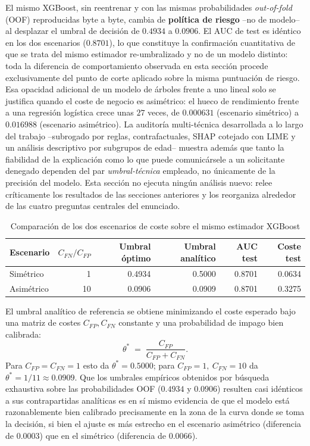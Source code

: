 \documentclass[11pt,a4paper]{article}
\begin{document}
El mismo XGBoost, sin reentrenar y con las mismas probabilidades \emph{out-of-fold} (OOF) reproducidas
byte a byte, cambia de \textbf{pol\'itica de riesgo} --no de modelo-- al desplazar el umbral de decisi\'on
de $0.4934$ a $0.0906$. El AUC de test es id\'entico en los dos escenarios ($0.8701$), lo que constituye
la confirmaci\'on cuantitativa de que se trata del mismo estimador re-umbralizado y no de un modelo
distinto: toda la diferencia de comportamiento observada en esta secci\'on procede exclusivamente del
punto de corte aplicado sobre la misma puntuaci\'on de riesgo. Esa opacidad adicional de un modelo de
\'arboles frente a uno lineal solo se justifica quando el coste de negocio es asim\'etrico: el hueco de
rendimiento frente a una regresi\'on log\'istica crece unas $27$ veces, de $0.000631$ (escenario sim\'etrico)
a $0.016988$ (escenario asim\'etrico). La auditor\'ia multi-t\'ecnica desarrollada a lo largo del trabajo
--subrogado por reglas, contrafactuales, SHAP cotejado con LIME y un an\'alisis descriptivo por subgrupos
de edad-- muestra adem\'as que tanto la fiabilidad de la explicaci\'on como lo que puede comunic\'arsele a
un solicitante denegado dependen del par \emph{umbral-t\'ecnica} empleado, no \'unicamente de la precisi\'on
del modelo. Esta secci\'on no ejecuta ning\'un an\'alisis nuevo: relee cr\'iticamente los resultados de las
secciones anteriores y los reorganiza alrededor de las cuatro preguntas centrales del enunciado.

\begin{table}[H]
\centering
\caption{Comparaci\'on de los dos escenarios de coste sobre el mismo estimador XGBoost}
\label{tab:reflexion-escenarios}
\begin{tabular}{lrrrrr}
\toprule
Escenario & $C_{FN}/C_{FP}$ & Umbral \'optimo & Umbral anal\'itico & AUC test & Coste test \\
\midrule
Sim\'etrico  & 1  & 0.4934 & 0.5000 & 0.8701 & 0.0634 \\
Asim\'etrico & 10 & 0.0906 & 0.0909 & 0.8701 & 0.3275 \\
\bottomrule
\end{tabular}
\end{table}

El umbral anal\'itico de referencia se obtiene minimizando el coste esperado bajo una matriz de costes
$C_{FP}, C_{FN}$ constante y una probabilidad de impago bien calibrada:
\[
\theta^{*} \;=\; \frac{C_{FP}}{C_{FP}+C_{FN}} .
\]
Para $C_{FP}=C_{FN}=1$ esto da $\theta^{*}=0.5000$; para $C_{FP}=1,\ C_{FN}=10$ da
$\theta^{*}=1/11\approx0.0909$. Que los umbrales emp\'iricos obtenidos por b\'usqueda exhaustiva sobre las
probabilidades OOF ($0.4934$ y $0.0906$) resulten casi id\'enticos a sus contrapartidas anal\'iticas es en
s\'i mismo evidencia de que el modelo est\'a razonablemente bien calibrado precisamente en la zona de la
curva donde se toma la decisi\'on, si bien el ajuste es m\'as estrecho en el escenario asim\'etrico
(diferencia de $0.0003$) que en el sim\'etrico (diferencia de $0.0066$).
\end{document}
